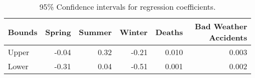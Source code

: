 \begin{table}[h!]
\centering
\begin{tabular}{|l|r|r|r|r|r|}
\hline
\rowcolor[HTML]{E7EAF6} 
\textbf{Bounds} & \textbf{Spring} & \textbf{Summer} & \textbf{Winter} & \textbf{Deaths} & \textbf{Bad Weather Accidents} \\ \hline
Upper & -0.04 & 0.32 & -0.21 & 0.010 & 0.003 \\ \hline
Lower & -0.31 & 0.04 & -0.51 & 0.001 & 0.002 \\ \hline
\end{tabular}
\caption{95\% Confidence intervals for regression coefficients.}
\end{table}
